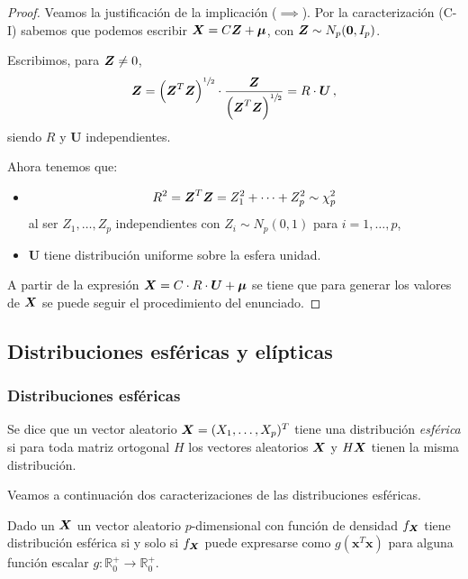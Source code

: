 \begin{proof}
  Veamos la justificación de la implicación ($\implies$). Por la caracterización (C-I) sabemos que podemos escribir $\boldsymbol{X} = C\boldsymbol{Z} + \boldsymbol \mu$, con $\boldsymbol{Z} \sim N_p(\boldsymbol 0, I_p)$.

  Escribimos, para $\boldsymbol{Z} \neq 0$, \[\boldsymbol{Z} = \left(\boldsymbol{Z}^T\boldsymbol{Z}\right)^{\sfrac{1}{2}} \cdot \frac{\boldsymbol{Z}}{\left(\boldsymbol{Z}^T\boldsymbol{Z}\right)^{\sfrac{1}{2}}} = R \cdot \boldsymbol U\,,\] siendo $R$ y $\boldsymbol U$ independientes.

  Ahora tenemos que: \begin{itemize}
    \item \[R^2 = \boldsymbol{Z}^T\boldsymbol{Z} = Z_1^2 + \cdots + Z_p^2 \sim \chi_p^2\]al ser $Z_1, \dots, Z_p$ independientes con $Z_i \sim N_p(0, 1)$ para $i = 1, \dots, p$,
    \item $\boldsymbol U$ tiene distribución uniforme sobre la esfera unidad.
  \end{itemize}

  A partir de la expresión $\boldsymbol{X} = C \cdot R \cdot \boldsymbol U + \boldsymbol \mu$ se tiene que para generar los valores de $\boldsymbol{X}$ se puede seguir el procedimiento del enunciado.
\end{proof}

\subsection{Distribuciones esféricas y elípticas}

\subsubsection{Distribuciones esféricas}

\begin{ndef}
  Se dice que un vector aleatorio $\boldsymbol{X} = (X_1, \dots, X_p)^T$ tiene una distribución \textit{esférica} si para toda matriz ortogonal $H$ los vectores aleatorios $\boldsymbol{X}$ y $H\boldsymbol{X}$ tienen la misma distribución.
\end{ndef}

Veamos a continuación dos caracterizaciones de las distribuciones esféricas.

\begin{nprop}
  Dado un $\boldsymbol{X}$ un vector aleatorio $p$-dimensional con función de densidad $f_{\boldsymbol{X}}$ tiene distribución esférica si y solo si $f_{\boldsymbol{X}}$ puede expresarse como $g(\boldsymbol x^T \boldsymbol x)$ para alguna función escalar $g : \mathbb R_0^+ \to \mathbb R_0^+$.
\end{nprop}

